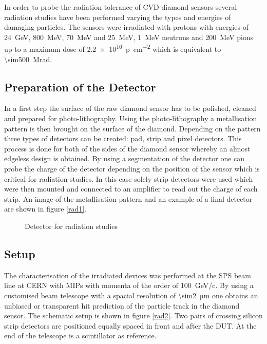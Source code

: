 In order to probe the radiation tolerance of \ac{CVD} diamond sensors several radiation studies have been performed varying the types and energies of damaging particles. The sensors were irradiated with protons with energies of \SI{24}{\giga\electronvolt}, \SI{800}{\mega\electronvolt}, \SI{70}{\mega\electronvolt} and \SI{25}{\mega\electronvolt}, \SI{1}{\mega\electronvolt} neutrons and \SI{200}{\mega\electronvolt} pions up to a maximum dose of \SI{2.2e16}{p\per\centi\meter^2} which is equivalent to \SI{\sim500}{\mega rad}.

\subsection{Preparation of the Detector}

In a first step the surface of the raw diamond sensor has to be polished, cleaned and prepared for photo-lithography. Using the photo-lithography a metallisation pattern is then brought on the surface of the diamond. Depending on the pattern three types of detectors can be created: pad, strip and pixel detectors. This process is done for both of the sides of the diamond sensor whereby an almost edgeless design is obtained. By using a segmentation of the detector one can probe the charge of the detector depending on the position of the sensor which is critical for radiation studies. In this case solely strip detectors were used which were then mounted and connected to an amplifier to read out the charge of each strip. An image of the metallisation pattern and an example of a final detector are shown in figure \vref{rad1}.

\begin{figure}
	\centering
	\caption{Detector for radiation studies}
	\label{rad1}
\end{figure}

\subsection{Setup}

The characterisation of the irradiated devices was performed at the \ac{SPS} beam line at CERN with \acp{MIP} with momenta of the order of \SI{100}{\giga\electronvolt/c}. By using a customised beam telescope with a spacial resolution of \SI{\sim2}{\micro\meter} one obtains an unbiased or transparent hit prediction of the particle track in the diamond sensor. The schematic setup is shown in figure \vref{rad2}. Two pairs of crossing silicon strip detectors are positioned equally spaced in front and after the \ac{DUT}. At the end of the telescope is a scintillator as reference.

